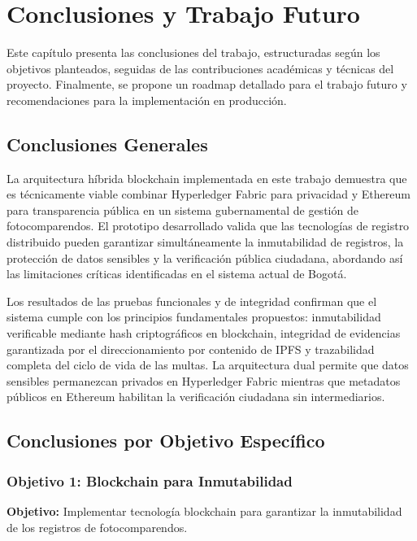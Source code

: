 \section{Conclusiones y Trabajo Futuro}

Este capítulo presenta las conclusiones del trabajo, estructuradas según los objetivos planteados, seguidas de las contribuciones académicas y técnicas del proyecto. Finalmente, se propone un roadmap detallado para el trabajo futuro y recomendaciones para la implementación en producción.

\subsection{Conclusiones Generales}

La arquitectura híbrida blockchain implementada en este trabajo demuestra que es técnicamente viable combinar Hyperledger Fabric para privacidad y Ethereum para transparencia pública en un sistema gubernamental de gestión de fotocomparendos. El prototipo desarrollado valida que las tecnologías de registro distribuido pueden garantizar simultáneamente la inmutabilidad de registros, la protección de datos sensibles y la verificación pública ciudadana, abordando así las limitaciones críticas identificadas en el sistema actual de Bogotá.

Los resultados de las pruebas funcionales y de integridad confirman que el sistema cumple con los principios fundamentales propuestos: inmutabilidad verificable mediante hash criptográficos en blockchain, integridad de evidencias garantizada por el direccionamiento por contenido de IPFS y trazabilidad completa del ciclo de vida de las multas. La arquitectura dual permite que datos sensibles permanezcan privados en Hyperledger Fabric mientras que metadatos públicos en Ethereum habilitan la verificación ciudadana sin intermediarios.

\subsection{Conclusiones por Objetivo Específico}

\subsubsection{Objetivo 1: Blockchain para Inmutabilidad}

\textbf{Objetivo:} Implementar tecnología blockchain para garantizar la inmutabilidad de los registros de fotocomparendos.

